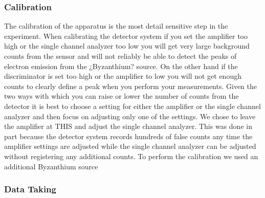 \subsubsection{Calibration}
\indent The calibration of the apparatus is the most detail sensitive step in the experiment.  When calibrating the detector system if you set the amplifier too high or the single channel analyzer too low you will get very large background counts from the sensor and will not reliably be able to detect the peaks of electron emission from the ¿Byzanthium? source.  On the other hand if the discriminator is set too high or the amplifier to low you will not get enough counts to clearly define a peak when you perform your measurements. Given the two ways with which you can raise or lower the number of counts from the detector it is best to choose a setting for either the amplifier or the single channel analyzer and then focus on adjusting only one of the settings.  We chose to leave the amplifier at THIS and adjust the single channel analyzer.  This was done in part because the detector system records hundreds of false counts any time the amplifier settings are adjusted while the single channel analyzer can be adjusted without registering any additional counts. To perform the calibration we used an additional Byzanthium source  

\subsubsection{Data Taking}


